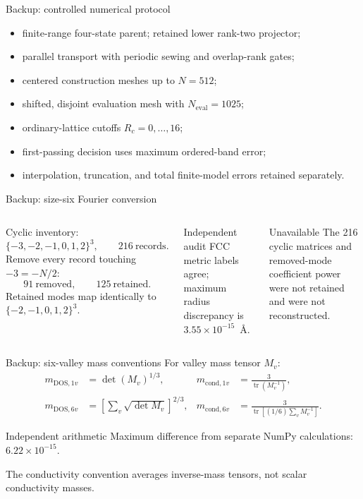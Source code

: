 \documentclass[aspectratio=169,10pt]{beamer}
\begin{document}
\begin{frame}{Backup: controlled numerical protocol}
  \small
  \begin{itemize}
    \item finite-range four-state parent; retained lower rank-two projector;
    \item parallel transport with periodic sewing and overlap-rank gates;
    \item centered construction meshes up to $N=512$;
    \item shifted, disjoint evaluation mesh with $N_{\mathrm{eval}}=1025$;
    \item ordinary-lattice cutoffs $R_c=0,\ldots,16$;
    \item first-passing decision uses maximum ordered-band error;
    \item interpolation, truncation, and total finite-model errors retained separately.
  \end{itemize}
\end{frame}

\begin{frame}{Backup: size-six Fourier conversion}
  \small
  \begin{columns}[T]
      Cyclic inventory:
      \[
        \{-3,-2,-1,0,1,2\}^3,\qquad216\ \text{records}.
      \]
      Remove every record touching $-3=-N/2$:
      \[
        91\ \text{removed},\qquad125\ \text{retained}.
      \]
      Retained modes map identically to $\{-2,-1,0,1,2\}^3$.
      \begin{exampleblock}{Independent audit}
        FCC metric labels agree; maximum radius discrepancy is
        $3.55\times10^{-15}$~\AA.
      \end{exampleblock}
      \begin{alertblock}{Unavailable}
        The 216 cyclic matrices and removed-mode coefficient power were not retained and
        were not reconstructed.
      \end{alertblock}
  \end{columns}
\end{frame}

\begin{frame}{Backup: six-valley mass conventions}
  \small
  For valley mass tensor $M_v$:
  \begin{align*}
    m_{\mathrm{DOS},1v}&=\det(M_v)^{1/3},&
    m_{\mathrm{cond},1v}&=\frac{3}{\operatorname{tr}(M_v^{-1})},\\
    m_{\mathrm{DOS},6v}&=\left[\sum_v\sqrt{\det M_v}\right]^{2/3},&
    m_{\mathrm{cond},6v}&=\frac{3}{\operatorname{tr}[(1/6)\sum_vM_v^{-1}]}.
  \end{align*}
  \begin{exampleblock}{Independent arithmetic}
    Maximum difference from separate NumPy calculations:
    $6.22\times10^{-15}$.
  \end{exampleblock}
  The conductivity convention averages inverse-mass tensors, not scalar conductivity masses.
\end{frame}
\end{document}
